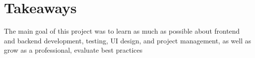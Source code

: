 \section{Takeaways}\label{sec:takeaways}

The main goal of this project
was to learn as much as possible about
frontend and backend development,
testing,
UI design, and
project management,
as well as grow as a professional,
evaluate best practices
